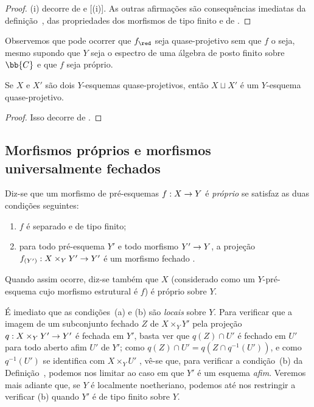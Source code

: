\documentclass[oneside,10pt]{amsart}
\makeatletter
\newcommand{\ega@arrow}[2]{\mathchoice{#1}{#2}{#2}{#2}}
\renewcommand{\to}{\ega@arrow{\longrightarrow}{\rightarrow}}
\let\EGAOriginalLabel\label
\renewcommand{\label}[1]{\phantomsection\EGAOriginalLabel{#1}}
\makeatother
\begin{document}
\begin{proof}
(i) decorre de  e [(i)].
As outras afirmações são consequências imediatas da definição~, das propriedades dos morfismos de tipo finito  e de .
\end{proof}

\begin{remark}[5.3.5]
\label{II.5.3.5}
Observemos que pode ocorrer que $f_\red$ seja quase-projetivo sem que $f$ o seja, mesmo supondo que $Y$ seja o espectro de uma álgebra de posto finito sobre $\bb{C}$ e que $f$ seja próprio.
\end{remark}

\begin{corollary}[5.3.6]
\label{II.5.3.6}
Se $X$ e $X'$ são dois $Y$-esquemas quase-projetivos, então $X\sqcup X'$ é um $Y$-esquema quase-projetivo.
\end{corollary}

\begin{proof}
Isso decorre de .
\end{proof}

\subsection{Morfismos próprios e morfismos universalmente fechados}
\label{subsection:II.5.4}

\begin{definition}[5.4.1]
\label{II.5.4.1}
Diz-se que um morfismo de pré-esquemas $f:X\to Y$ é \emph{próprio} se satisfaz as duas condições seguintes:
\begin{enumerate}
  \item[(a)] $f$ é separado e de tipo finito;
  \item[(b)] para todo pré-esquema $Y'$ e todo morfismo $Y'\to Y$, a projeção $f_{(Y')}:X\times_Y Y'\to Y'$ é um morfismo fechado .
\end{enumerate}

Quando assim ocorre, diz-se também que $X$ (considerado como um $Y$-pré-esquema cujo morfismo estrutural é $f$) é próprio sobre $Y$.
\end{definition}

É imediato que as condições~(a) e (b) são \emph{locais} sobre $Y$.
Para verificar que a imagem de um subconjunto fechado $Z$ de $X\times_Y Y'$ pela projeção $q:X\times_Y Y'\to Y'$ é fechada em $Y'$, basta ver que $q(Z)\cap U'$ é fechado em $U'$ para todo aberto afim $U'$ de $Y'$;
como $q(Z)\cap U'=q(Z\cap q^{-1}(U'))$, e como $q^{-1}(U')$ se identifica com $X\times_Y U'$ , vê-se que, para verificar a condição~(b) da Definição~, podemos nos limitar ao caso em que $Y'$ é um esquema \emph{afim}.
Veremos mais adiante  que, se $Y$ é localmente noetheriano, podemos até nos restringir a verificar (b) quando $Y'$ é de tipo finito sobre $Y$.
\end{document}
